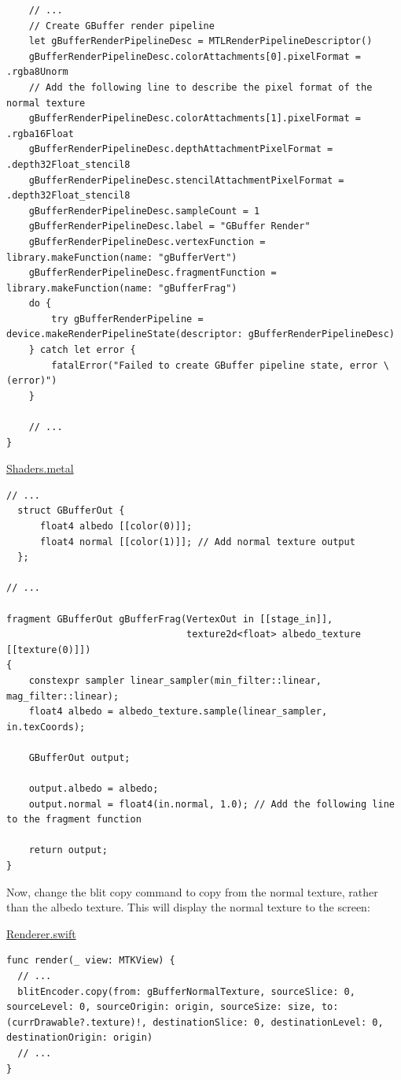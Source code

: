 \documentclass[11pt]{article}
\begin{document}
\begin{verbatim}
    // ...
    // Create GBuffer render pipeline
    let gBufferRenderPipelineDesc = MTLRenderPipelineDescriptor()
    gBufferRenderPipelineDesc.colorAttachments[0].pixelFormat = .rgba8Unorm
    // Add the following line to describe the pixel format of the normal texture
    gBufferRenderPipelineDesc.colorAttachments[1].pixelFormat = .rgba16Float
    gBufferRenderPipelineDesc.depthAttachmentPixelFormat = .depth32Float_stencil8
    gBufferRenderPipelineDesc.stencilAttachmentPixelFormat = .depth32Float_stencil8
    gBufferRenderPipelineDesc.sampleCount = 1
    gBufferRenderPipelineDesc.label = "GBuffer Render"
    gBufferRenderPipelineDesc.vertexFunction = library.makeFunction(name: "gBufferVert")
    gBufferRenderPipelineDesc.fragmentFunction = library.makeFunction(name: "gBufferFrag")
    do {
        try gBufferRenderPipeline = device.makeRenderPipelineState(descriptor: gBufferRenderPipelineDesc)
    } catch let error {
        fatalError("Failed to create GBuffer pipeline state, error \(error)")
    }

    // ...
}
\end{verbatim}

\uline{Shaders.metal}
\begin{verbatim}
// ...
  struct GBufferOut {
      float4 albedo [[color(0)]];
      float4 normal [[color(1)]]; // Add normal texture output
  };

// ...

fragment GBufferOut gBufferFrag(VertexOut in [[stage_in]],
                                texture2d<float> albedo_texture [[texture(0)]])
{
    constexpr sampler linear_sampler(min_filter::linear, mag_filter::linear);
    float4 albedo = albedo_texture.sample(linear_sampler, in.texCoords);

    GBufferOut output;

    output.albedo = albedo;
    output.normal = float4(in.normal, 1.0); // Add the following line to the fragment function

    return output;
}
\end{verbatim}

Now, change the blit copy command to copy from the normal texture, rather than
the albedo texture. This will display the normal texture to the screen:

\uline{Renderer.swift}
\begin{verbatim}
func render(_ view: MTKView) {
  // ...
  blitEncoder.copy(from: gBufferNormalTexture, sourceSlice: 0, sourceLevel: 0, sourceOrigin: origin, sourceSize: size, to: (currDrawable?.texture)!, destinationSlice: 0, destinationLevel: 0, destinationOrigin: origin)
  // ...
}
\end{verbatim}
\end{document}
